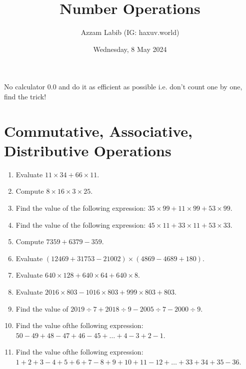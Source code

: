 \documentclass[11pt]{scrartcl}
\title{Number Operations}
\author{Azzam Labib (IG: haxuv.world)}
\date{Wednesday, 8 May 2024}
\begin{document}
\maketitle


\begin{tcolorbox}[colback=red!10,colframe=red!75!black]
No calculator 0.0 and do it as efficient as possible i.e. don't count one by one, find the trick!
\end{tcolorbox}


\section{Commutative, Associative, Distributive Operations}
\begin{enumerate}
\item Evaluate $11 \times 34 + 66 \times 11$.
\vspace{8cm}\item Compute $8 \times 16 \times 3 \times 25$.
\vspace{8cm}\item Find the value of the following expression: $35 \times 99 + 11 \times 99 + 53 \times 99$.
\vspace{8cm}\item Find the value of the following expression: $45 \times 11 + 33 \times 11 + 53 \times 33$.
\vspace{8cm}\item Compute $7359 + 6379 - 359$.
\vspace{8cm}\item Evaluate
$(12469+31753-21002) \times (4869-4689+180)$.
\vspace{8cm}\item Evaluate $640 \times 128 + 640 \times 64 + 640 \times 8$.
\vspace{8cm}\item Evaluate $2016 \times 803 - 1016 \times 803 + 999 \times 803 + 803$.
\vspace{8cm}\item Find the value of $2019 \div 7 + 2018 \div 9 - 2005 \div 7 - 2000 \div 9$.
\vspace{8cm}\item Find the value ofthe following expression:
$50-49+48-47+46-45+\dots+4-3+2-1$.
\vspace{8cm}\item Find the value ofthe following expression:\\
$1+2+3-4+5+6+7-8+9+10+11-12+\dots+33+34+35-36$.
\end{enumerate}
\end{document}
